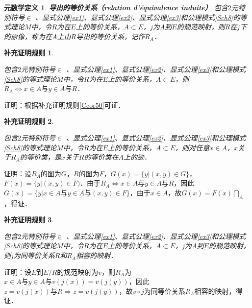 \documentclass[12pt, a4paper, oneside]{book}
\newtheorem{metadef}{元数学定义}
\newtheorem{Ccor}{补充证明规则}
\begin{document}
			\begin{metadef}
				\textbf{导出的等价关系（relation d'équivalence induite）}
				包含$2$元特别符号$\in$ 、显式公理\ref{ex1}、显式公理\ref{ex2}、显式公理\ref{ex3}和公理模式\ref{Sch8}的等式理论$M$中，令$R$为在$E$上的等价关系，$A\subset E$，$j$为$A$到$E$的规范映射，则$R$在$j$下的原像，称为在$A$上由$R$导出的等价关系，记作$R_A$．
			\end{metadef}

			\begin{Ccor}\label{Ccor52}
				\hfill\par
				包含$2$元特别符号$\in$ 、显式公理\ref{ex1}、显式公理\ref{ex2}、显式公理\ref{ex3}和公理模式\ref{Sch8}的等式理论$M$中，令$R$为在$E$上的等价关系，$A\subset E$，则$R_A\Leftrightarrow x\in A\text{与}y\in A\text{与}R$．
			\end{Ccor}
			证明：根据补充证明规则\ref{Ccor50}可证．
			
			\begin{Ccor}\label{Ccor53}
				\hfill\par
				包含$2$元特别符号$\in$ 、显式公理\ref{ex1}、显式公理\ref{ex2}、显式公理\ref{ex3}和公理模式\ref{Sch8}的等式理论$M$中，令$R$为在$E$上的等价关系，$A\subset E$，则对任意$x\in A$，$x$关于$R_A$的等价类，是$x$关于$R$的等价类在$A$上的迹．
			\end{Ccor}
			证明：设$R_A$的图为$G$，$R$的图为$F$，$G(x)=\{y|(x, y)\in G\}$，$F(x)=\{y|(x, y)\in F)$．由于$R_A\Leftrightarrow x\in A\text{与}y\in A\text{与}R$，因此$G(x)= \{y|x\in A\text{与}y\in A\text{与}(x, y)\in F\}$，由于$x\in A$，故$G(x)=F(x)\bigcap\limits_A$，得证．
			
			
			\begin{Ccor}\label{Ccor54}
				\hfill\par
				包含$2$元特别符号$\in$ 、显式公理\ref{ex1}、显式公理\ref{ex2}、显式公理\ref{ex3}和公理模式\ref{Sch8}的等式理论$M$中，令$R$为在$E$上的等价关系，$A\subset E$，$j$为$A$到$E$的规范映射，则$j$为同等价关系$R$和$R_A$相容的映射．
			\end{Ccor}
			证明：设$E$到$E/R$的规范映射为$v$，则$R_A$为$x\in A\text{与}y\in A\text{与}v(j(x))=v(j(y))$，因此$z= v(j(x))\text{与}R\Rightarrow z=v(j(y))$，故$v\circ j$为同等价关系$R_A$相容的映射，得证．
			
\end{document}
